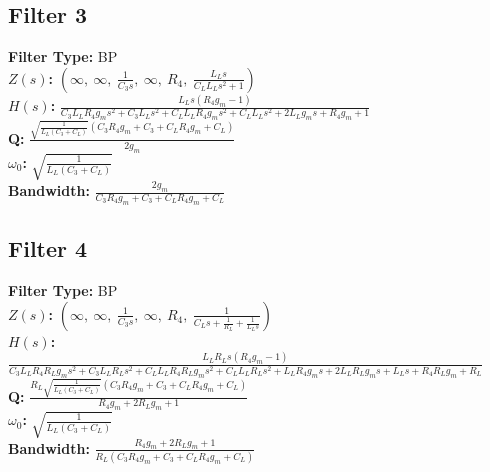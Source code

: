 \documentclass{article}
\begin{document}
\subsection*{Filter 3}
\textbf{Filter Type:} BP \\ 
\textbf{$Z(s)$:} $\left( \infty, \  \infty, \  \frac{1}{C_{3} s}, \  \infty, \  R_{4}, \  \frac{L_{L} s}{C_{L} L_{L} s^{2} + 1}\right)$ \\ 
\textbf{$H(s)$:} $\frac{L_{L} s \left(R_{4} g_{m} - 1\right)}{C_{3} L_{L} R_{4} g_{m} s^{2} + C_{3} L_{L} s^{2} + C_{L} L_{L} R_{4} g_{m} s^{2} + C_{L} L_{L} s^{2} + 2 L_{L} g_{m} s + R_{4} g_{m} + 1}$ \\ 
\textbf{Q:} $\frac{\sqrt{\frac{1}{L_{L} \left(C_{3} + C_{L}\right)}} \left(C_{3} R_{4} g_{m} + C_{3} + C_{L} R_{4} g_{m} + C_{L}\right)}{2 g_{m}}$ \\ 
\textbf{$\omega_0$:} $\sqrt{\frac{1}{L_{L} \left(C_{3} + C_{L}\right)}}$ \\ 
\textbf{Bandwidth:} $\frac{2 g_{m}}{C_{3} R_{4} g_{m} + C_{3} + C_{L} R_{4} g_{m} + C_{L}}$ \\ 
\subsection*{Filter 4}
\textbf{Filter Type:} BP \\ 
\textbf{$Z(s)$:} $\left( \infty, \  \infty, \  \frac{1}{C_{3} s}, \  \infty, \  R_{4}, \  \frac{1}{C_{L} s + \frac{1}{R_{L}} + \frac{1}{L_{L} s}}\right)$ \\ 
\textbf{$H(s)$:} $\frac{L_{L} R_{L} s \left(R_{4} g_{m} - 1\right)}{C_{3} L_{L} R_{4} R_{L} g_{m} s^{2} + C_{3} L_{L} R_{L} s^{2} + C_{L} L_{L} R_{4} R_{L} g_{m} s^{2} + C_{L} L_{L} R_{L} s^{2} + L_{L} R_{4} g_{m} s + 2 L_{L} R_{L} g_{m} s + L_{L} s + R_{4} R_{L} g_{m} + R_{L}}$ \\ 
\textbf{Q:} $\frac{R_{L} \sqrt{\frac{1}{L_{L} \left(C_{3} + C_{L}\right)}} \left(C_{3} R_{4} g_{m} + C_{3} + C_{L} R_{4} g_{m} + C_{L}\right)}{R_{4} g_{m} + 2 R_{L} g_{m} + 1}$ \\ 
\textbf{$\omega_0$:} $\sqrt{\frac{1}{L_{L} \left(C_{3} + C_{L}\right)}}$ \\ 
\textbf{Bandwidth:} $\frac{R_{4} g_{m} + 2 R_{L} g_{m} + 1}{R_{L} \left(C_{3} R_{4} g_{m} + C_{3} + C_{L} R_{4} g_{m} + C_{L}\right)}$ \\ 
\end{document}
